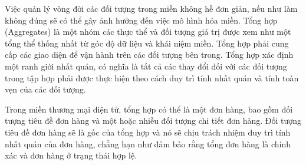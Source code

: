 Việc quản lý vòng đời các đối tượng trong miền không hề đơn giản, nếu như làm không đúng sẽ có thể gây ảnh hưởng đến việc mô hình hóa miền. Tổng hợp (Aggregates) là một nhóm các thực thể và đối tượng giá trị được xem như một tổng thể thống nhất từ góc độ dữ liệu và khái niệm miền. Tổng hợp phải cung cấp các giao diện để vận hành trên các đối tượng bên trong. Tổng hợp xác định một ranh giới nhất quán, có nghĩa là tất cả các thay đổi đối với các đối tượng trong tập hợp phải được thực hiện theo cách duy trì tính nhất quán và tính toàn vẹn của các đối tượng.

\begin{example} Trong miền thương mại điện tử, tổng hợp có thể là một đơn hàng, bao gồm đối tượng tiêu đề đơn hàng và một hoặc nhiều đối tượng chi tiết đơn hàng. Đối tượng tiêu đề đơn hàng sẽ là gốc của tổng hợp và nó sẽ chịu trách nhiệm duy trì tính nhất quán của đơn hàng, chẳng hạn như đảm bảo rằng tổng đơn hàng là chính xác và đơn hàng ở trạng thái hợp lệ.

\end{example}









